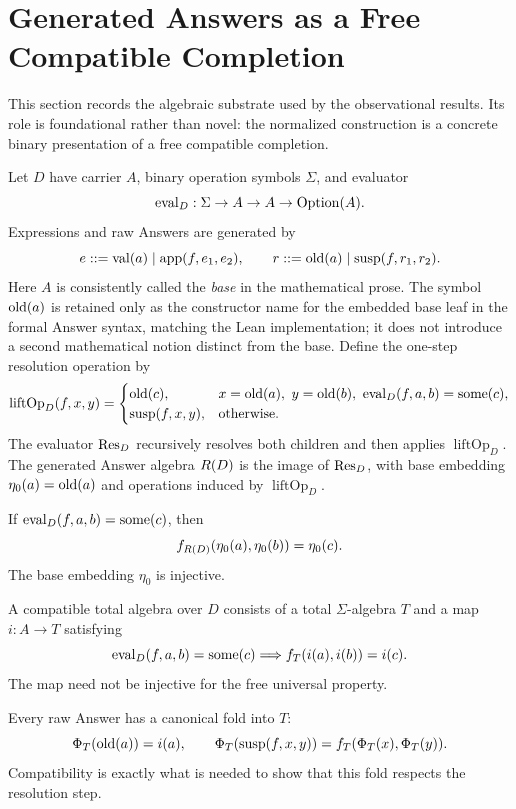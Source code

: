 \section{Generated Answers as a Free Compatible Completion}
\label{sec:free-completion}

This section records the algebraic substrate used by the observational results.
Its role is foundational rather than novel: the normalized construction is a
concrete binary presentation of a free compatible completion.

Let $D$ have carrier $A$, binary operation symbols $\Sigma$, and evaluator
\[
  \operatorname{eval}_D:\Sigma\to A\to A\to\operatorname{Option}(A).
\]
Expressions and raw Answers are generated by
\[
 e::=\operatorname{val}(a)\mid\operatorname{app}(f,e_1,e_2),
 \qquad
 r::=\operatorname{old}(a)\mid\operatorname{susp}(f,r_1,r_2).
\]
Here $A$ is consistently called the \emph{base} in the mathematical prose.
The symbol $\operatorname{old}(a)$ is retained only as the constructor name for the embedded
base leaf in the formal Answer syntax, matching the Lean implementation; it
does not introduce a second mathematical notion distinct from the base.
Define the one-step resolution operation by
\[
\operatorname{liftOp}_D(f,x,y)=
\begin{cases}
 \old(c),&x=\old(a),\ y=\old(b),\ \eval_D(f,a,b)=\operatorname{some}(c),\\
 \susp(f,x,y),&\text{otherwise}.
\end{cases}
\]
The evaluator $\operatorname{Res}_D$ recursively resolves both children and then applies
$\operatorname{liftOp}_D$.  The generated Answer algebra $R(D)$ is the
image of $\operatorname{Res}_D$, with base embedding $\eta_0(a)=\operatorname{old}(a)$ and operations
induced by $\operatorname{liftOp}_D$.

\begin{proposition}
\label{prop:generated-conservativity}
If $\operatorname{eval}_D(f,a,b)=\operatorname{some}(c)$, then
\[
 f_{R(D)}(\eta_0(a),\eta_0(b))=\eta_0(c).
\]
The base embedding $\eta_0$ is injective.
\end{proposition}

A compatible total algebra over $D$ consists of a total $\Sigma$-algebra $T$
and a map $i:A\to T$ satisfying
\[
 \operatorname{eval}_D(f,a,b)=\operatorname{some}(c)
 \Longrightarrow f_T(i(a),i(b))=i(c).
\]
The map need not be injective for the free universal property.

Every raw Answer has a canonical fold into $T$:
\[
 \Phi_T(\operatorname{old}(a))=i(a),\qquad
 \Phi_T(\operatorname{susp}(f,x,y))=f_T(\Phi_T(x),\Phi_T(y)).
\]
Compatibility is exactly what is needed to show that this fold respects the
resolution step.

